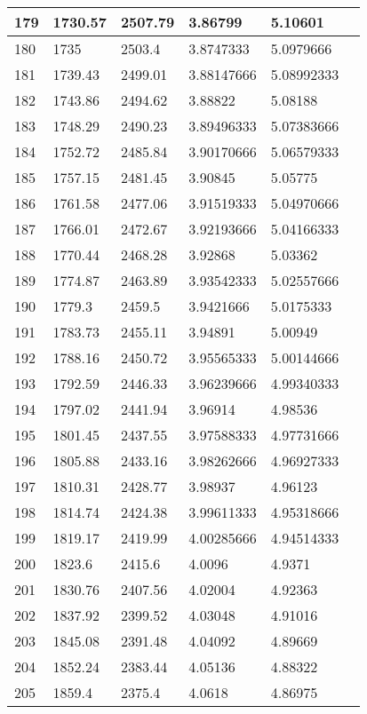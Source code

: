 \documentclass[twocolumn]{article}
\begin{document}
\begin{tabular}{l|l|l|l|l|l}
179	&	1730.57	&	2507.79	&	3.86799	&	5.10601 \\ \hline
180	&	1735	&	2503.4	&	3.8747333	&	5.0979666 \\ \hline
181	&	1739.43	&	2499.01	&	3.88147666	&	5.08992333 \\ \hline
182	&	1743.86	&	2494.62	&	3.88822	&	5.08188 \\ \hline
183	&	1748.29	&	2490.23	&	3.89496333	&	5.07383666 \\ \hline
184	&	1752.72	&	2485.84	&	3.90170666	&	5.06579333 \\ \hline
185	&	1757.15	&	2481.45	&	3.90845	&	5.05775 \\ \hline
186	&	1761.58	&	2477.06	&	3.91519333	&	5.04970666 \\ \hline
187	&	1766.01	&	2472.67	&	3.92193666	&	5.04166333 \\ \hline
188	&	1770.44	&	2468.28	&	3.92868	&	5.03362 \\ \hline
189	&	1774.87	&	2463.89	&	3.93542333	&	5.02557666 \\ \hline
190	&	1779.3	&	2459.5	&	3.9421666	&	5.0175333 \\ \hline
191	&	1783.73	&	2455.11	&	3.94891	&	5.00949 \\ \hline
192	&	1788.16	&	2450.72	&	3.95565333	&	5.00144666 \\ \hline
193	&	1792.59	&	2446.33	&	3.96239666	&	4.99340333 \\ \hline
194	&	1797.02	&	2441.94	&	3.96914	&	4.98536 \\ \hline
195	&	1801.45	&	2437.55	&	3.97588333	&	4.97731666 \\ \hline
196	&	1805.88	&	2433.16	&	3.98262666	&	4.96927333 \\ \hline
197	&	1810.31	&	2428.77	&	3.98937	&	4.96123 \\ \hline
198	&	1814.74	&	2424.38	&	3.99611333	&	4.95318666 \\ \hline
199	&	1819.17	&	2419.99	&	4.00285666	&	4.94514333 \\ \hline
200	&	1823.6	&	2415.6	&	4.0096	&	4.9371 \\ \hline
201	&	1830.76	&	2407.56	&	4.02004	&	4.92363 \\ \hline
202	&	1837.92	&	2399.52	&	4.03048	&	4.91016 \\ \hline
203	&	1845.08	&	2391.48	&	4.04092	&	4.89669 \\ \hline
204	&	1852.24	&	2383.44	&	4.05136	&	4.88322 \\ \hline
205	&	1859.4	&	2375.4	&	4.0618	&	4.86975 \\ \hline

\end{tabular}
\end{document}
